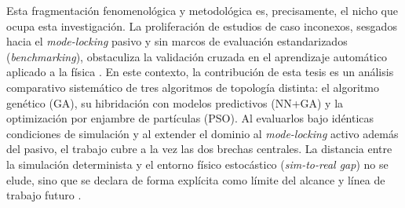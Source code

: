 Esta fragmentación fenomenológica y metodológica es, precisamente, el nicho que ocupa esta investigación. La proliferación de estudios de caso inconexos, sesgados hacia el \emph{mode-locking} pasivo y sin marcos de evaluación estandarizados (\emph{benchmarking}), obstaculiza la validación cruzada en el aprendizaje automático aplicado a la física \cite{Pineau2021}. En este contexto, la contribución de esta tesis es un análisis comparativo sistemático de tres algoritmos de topología distinta: el algoritmo genético (GA), su hibridación con modelos predictivos (NN+GA) y la optimización por enjambre de partículas (PSO). Al evaluarlos bajo idénticas condiciones de simulación y al extender el dominio al \emph{mode-locking} activo además del pasivo, el trabajo cubre a la vez las dos brechas centrales. La distancia entre la simulación determinista y el entorno físico estocástico (\emph{sim-to-real gap}) no se elude, sino que se declara de forma explícita como límite del alcance y línea de trabajo futuro \cite{Zhao2020}.
